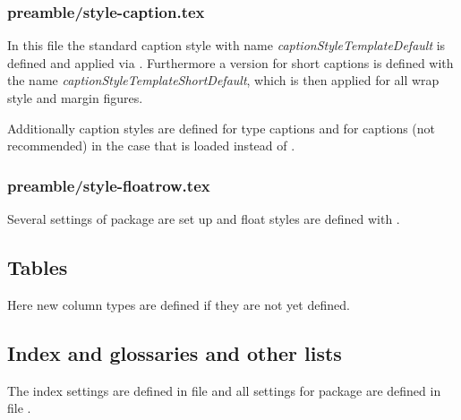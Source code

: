 \subsubsection{preamble/style-caption.tex}

In this file the standard caption style with name \emph{captionStyleTemplateDefault} is defined and applied via . Furthermore a version for short captions is defined with the name \emph{captionStyleTemplateShortDefault}, which is then applied for all wrap style and margin figures.

Additionally caption styles are defined for  type captions and for  captions (not recommended) in the case that  is loaded instead of .


\subsubsection{preamble/style-floatrow.tex}

Several settings of package  are set up and float styles are defined with .



\subsection{Tables}

Here new column types are defined if they are not yet defined.


\subsection{Index and glossaries and other lists}

The index settings are defined in file  and all settings for package  are defined in file .

